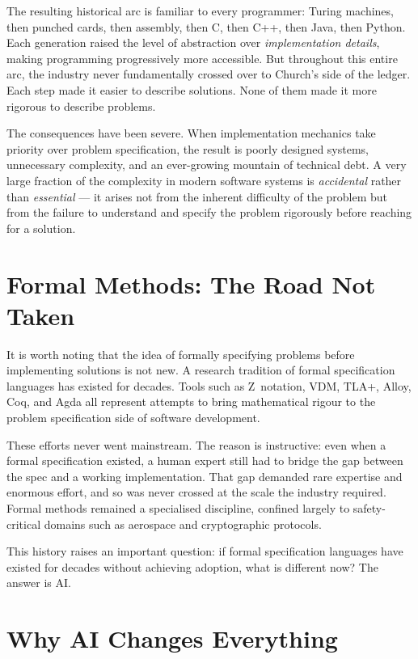 \documentclass[12pt]{article}
\begin{document}
The resulting historical arc is familiar to every programmer: Turing
machines, then punched cards, then assembly, then C, then C++, then Java,
then Python. Each generation raised the level of abstraction over
\emph{implementation details}, making programming progressively more
accessible. But throughout this entire arc, the industry never fundamentally
crossed over to Church's side of the ledger. Each step made it easier to
describe solutions. None of them made it more rigorous to describe problems.

The consequences have been severe. When implementation mechanics take
priority over problem specification, the result is poorly designed systems,
unnecessary complexity, and an ever-growing mountain of technical debt. A
very large fraction of the complexity in modern software systems is
\emph{accidental} rather than \emph{essential} --- it arises not from the
inherent difficulty of the problem but from the failure to understand and
specify the problem rigorously before reaching for a solution.

\section{Formal Methods: The Road Not Taken}

It is worth noting that the idea of formally specifying problems before
implementing solutions is not new. A research tradition of formal
specification languages has existed for decades. Tools such as Z~notation,
VDM, TLA+, Alloy, Coq, and Agda all represent attempts to bring
mathematical rigour to the problem specification side of software development.

These efforts never went mainstream. The reason is instructive: even when a
formal specification existed, a human expert still had to bridge the gap
between the spec and a working implementation. That gap demanded rare
expertise and enormous effort, and so was never crossed at the scale the
industry required. Formal methods remained a specialised discipline, confined
largely to safety-critical domains such as aerospace and cryptographic
protocols.

This history raises an important question: if formal specification languages
have existed for decades without achieving adoption, what is different now?
The answer is AI.

\section{Why AI Changes Everything}
\end{document}
